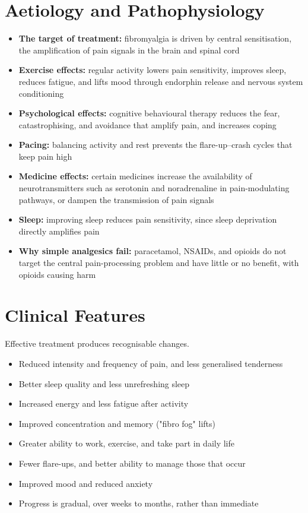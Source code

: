 \section*{Aetiology and Pathophysiology}
\begin{itemize}
    \item \textbf{The target of treatment:} fibromyalgia is driven by central sensitisation, the amplification of pain signals in the brain and spinal cord
    \item \textbf{Exercise effects:} regular activity lowers pain sensitivity, improves sleep, reduces fatigue, and lifts mood through endorphin release and nervous system conditioning
    \item \textbf{Psychological effects:} cognitive behavioural therapy reduces the fear, catastrophising, and avoidance that amplify pain, and increases coping
    \item \textbf{Pacing:} balancing activity and rest prevents the flare-up--crash cycles that keep pain high
    \item \textbf{Medicine effects:} certain medicines increase the availability of neurotransmitters such as serotonin and noradrenaline in pain-modulating pathways, or dampen the transmission of pain signals
    \item \textbf{Sleep:} improving sleep reduces pain sensitivity, since sleep deprivation directly amplifies pain
    \item \textbf{Why simple analgesics fail:} paracetamol, NSAIDs, and opioids do not target the central pain-processing problem and have little or no benefit, with opioids causing harm
\end{itemize}

\section*{Clinical Features}
Effective treatment produces recognisable changes.
\begin{itemize}
    \item Reduced intensity and frequency of pain, and less generalised tenderness
    \item Better sleep quality and less unrefreshing sleep
    \item Increased energy and less fatigue after activity
    \item Improved concentration and memory ("fibro fog" lifts)
    \item Greater ability to work, exercise, and take part in daily life
    \item Fewer flare-ups, and better ability to manage those that occur
    \item Improved mood and reduced anxiety
    \item Progress is gradual, over weeks to months, rather than immediate
\end{itemize}

